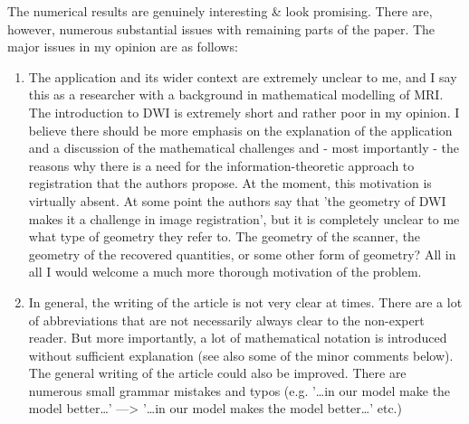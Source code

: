 \documentclass[11pt,a4paper]{article}
\begin{document}
The numerical results are genuinely interesting \& look promising. There are, however, numerous substantial issues with remaining parts of the paper. The major issues in my opinion are as follows:
\begin{enumerate}
    \item  The application and its wider context are extremely unclear to me, and I say this as a researcher with a background in mathematical modelling of MRI. The introduction to DWI is extremely short and rather poor in my opinion. I believe there should be more emphasis on the explanation of the application and a discussion of the mathematical challenges and - most importantly - the reasons why there is a need for the information-theoretic approach to registration that the authors propose. At the moment, this motivation is virtually absent. At some point the authors say that 'the geometry of DWI makes it a challenge in image registration', but it is completely unclear to me what type of geometry they refer to. The geometry of the scanner, the geometry of the recovered quantities, or some other form of geometry? All in all I would welcome a much more thorough motivation of the problem.
\item[] In general, the writing of the article is not very clear at times. There are a lot of abbreviations that are not necessarily always clear to the non-expert reader. But more importantly, a lot of mathematical notation is introduced without sufficient explanation (see also some of the minor comments below). The general writing of the article could also be improved. There are numerous small grammar mistakes and typos (e.g. '…in our model make the model better…' —> '…in our model makes the model better…' etc.)

\end{enumerate}
\end{document}

